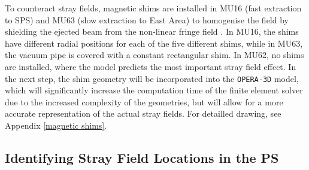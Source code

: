 To counteract stray fields, magnetic shims are installed in MU16 (fast extraction to SPS) and MU63 (slow extraction to East Area) to homogenise the field by shielding the ejected beam from the non-linear fringe field \cite{zickler_influence_nodate}. In MU16, the shims have different radial positions for each of the five different shims, while in MU63, the vacuum pipe is covered with a constant rectangular shim. In MU62, no shims are installed, where the model predicts the most important stray field effect. In the next step, the shim geometry will be incorporated into the \texttt{OPERA-3D} model, which will significantly increase the computation time of the finite element solver due to the increased complexity of the geometries, but will allow for a more accurate representation of the actual stray fields. For detailled drawing, see Appendix \ref{magnetic shims}.








\subsection{Identifying Stray Field Locations in the PS}

